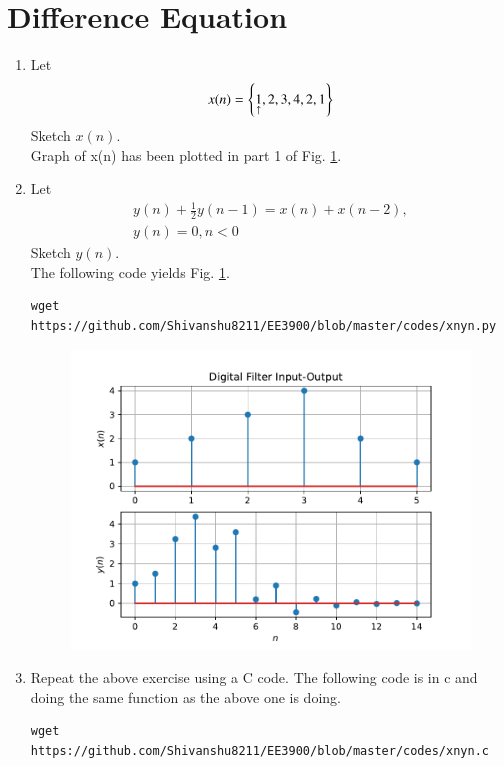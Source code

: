 \documentclass[journal,12pt,twocolumn]{IEEEtran}
\renewcommand\thesection{\arabic{section}}
\begin{document}
\section{Difference Equation}
\begin{enumerate}[label=\thesection.\arabic*,ref=\thesection.\theenumi]
     \item Let
           \begin{equation}
                x(n) = \left\{\underset{\uparrow}{1},2,3,4,2,1\right\}
           \end{equation}
           Sketch $x(n)$. \\
           \solution Graph of x(n) has been plotted in part 1 of Fig. \ref{fig:xnyn}.
     \item Let
           \begin{multline}
                \label{eq:iir_filter}
                y(n) + \frac{1}{2}y(n-1) = x(n) + x(n-2),
                \\
                y(n) = 0, n < 0
           \end{multline}
           Sketch $y(n)$.
           \\
           \solution The following code yields Fig. \ref{fig:xnyn}.
           \begin{lstlisting}
wget https://github.com/Shivanshu8211/EE3900/blob/master/codes/xnyn.py
\end{lstlisting}
           \begin{figure}[!ht]
                \begin{center}
                     \includegraphics[width=\columnwidth]{./figs/xnyn}
                \end{center}
                \label{fig:xnyn}
           \end{figure}
     \item Repeat the above exercise using a C code.
           \solution The following code is in c and doing the same function as the above one is doing.
           \begin{lstlisting}
wget https://github.com/Shivanshu8211/EE3900/blob/master/codes/xnyn.c
           \end{lstlisting}
\end{enumerate}
\end{document}

